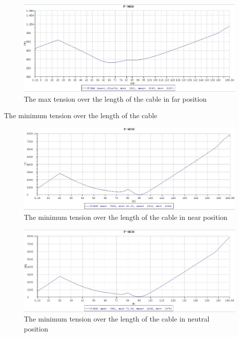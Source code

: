 \begin{figure}[H]
\centering
\includegraphics[scale=0.5]{figures/fmaxfar}
\caption{The max tension over the length of the cable in far position}
 \label{fig:fmaxfar}
\end{figure}

\noindent The minimum tension over the length of the cable

\begin{figure}[H]
\centering
\includegraphics[scale=0.5]{figures/fminnear}
\caption{The minimum tension over the length of the cable in near position}
 \label{fig:fminnear}
\end{figure}


\begin{figure}[H]
\centering
\includegraphics[scale=0.5]{figures/fminneu}
\caption{The minimum tension over the length of the cable in neutral position}
 \label{fig:fminneu}
\end{figure}


